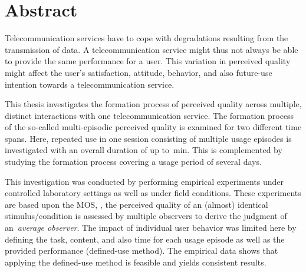 
\chapter*{Abstract}
Telecommunication services have to cope with degradations resulting from the transmission of data.
A telecommunication service might thus not always be able to provide the same performance for a user.
This variation in perceived quality might affect the user's satisfaction, attitude, behavior, and also future-use intention towards a telecommunication service.

This thesis investigates the formation process of perceived quality across multiple, distinct interactions with one telecommunication service.
The formation process of the so-called multi-episodic perceived quality is examined for two different time spans.
Here, repeated use in one session consisting of multiple usage episodes is investigated with an overall duration of up to~\unit[45]{min}.
This is complemented by studying the formation process covering a usage period of several days.

This investigation was conducted by performing empirical experiments under controlled laboratory settings as well as under field conditions.
These experiments are based upon the \acf{MOS}, \ie,  the perceived quality of an (almost) identical stimulus/condition is assessed by multiple observers to derive the judgment of an~\emph{average observer}.
The impact of individual user behavior was limited here by defining the task, content, and also time for each usage episode as well as the provided performance (defined-use method).
The empirical data shows that applying the defined-use method is feasible and yields consistent results.

